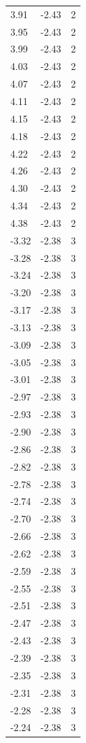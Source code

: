\begin{longtable}{lrr}
  3.91 & -2.43 & 2 \\
  3.95 & -2.43 & 2 \\
  3.99 & -2.43 & 2 \\
  4.03 & -2.43 & 2 \\
  4.07 & -2.43 & 2 \\
  4.11 & -2.43 & 2 \\
  4.15 & -2.43 & 2 \\
  4.18 & -2.43 & 2 \\
  4.22 & -2.43 & 2 \\
  4.26 & -2.43 & 2 \\
  4.30 & -2.43 & 2 \\
  4.34 & -2.43 & 2 \\
  4.38 & -2.43 & 2 \\
  -3.32 & -2.38 & 3 \\
  -3.28 & -2.38 & 3 \\
  -3.24 & -2.38 & 3 \\
  -3.20 & -2.38 & 3 \\
  -3.17 & -2.38 & 3 \\
  -3.13 & -2.38 & 3 \\
  -3.09 & -2.38 & 3 \\
  -3.05 & -2.38 & 3 \\
  -3.01 & -2.38 & 3 \\
  -2.97 & -2.38 & 3 \\
  -2.93 & -2.38 & 3 \\
  -2.90 & -2.38 & 3 \\
  -2.86 & -2.38 & 3 \\
  -2.82 & -2.38 & 3 \\
  -2.78 & -2.38 & 3 \\
  -2.74 & -2.38 & 3 \\
  -2.70 & -2.38 & 3 \\
  -2.66 & -2.38 & 3 \\
  -2.62 & -2.38 & 3 \\
  -2.59 & -2.38 & 3 \\
  -2.55 & -2.38 & 3 \\
  -2.51 & -2.38 & 3 \\
  -2.47 & -2.38 & 3 \\
  -2.43 & -2.38 & 3 \\
  -2.39 & -2.38 & 3 \\
  -2.35 & -2.38 & 3 \\
  -2.31 & -2.38 & 3 \\
  -2.28 & -2.38 & 3 \\
  -2.24 & -2.38 & 3 \\

\end{longtable}
